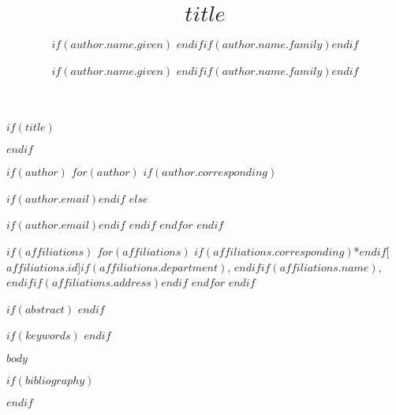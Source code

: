 \documentclass[$for(classoption)$$classoption$$sep$,$endfor$]{$documentclass$}
\theoremstyle{thmstyleone}%
\theoremstyle{thmstyletwo}%
\theoremstyle{thmstylethree}%
\begin{document}
$if(title)$
\title{$title$}
$endif$


$if(author)$
$for(author)$
$if(author.corresponding)$
\author*[$if(author.affiliations)$$for(author.affiliations)$$author.affiliations$$sep$,$endfor$$endif$]{$if(author.name.given)$ $endif$$if(author.name.family)$$endif$}$if(author.email)$$endif$
$else$
\author[$if(author.affiliations)$$for(author.affiliations)$$author.affiliations$$sep$,$endfor$$endif$]{$if(author.name.given)$ $endif$$if(author.name.family)$$endif$}$if(author.email)$$endif$
$endif$
$endfor$
$endif$

$if(affiliations)$
$for(affiliations)$
\affil$if(affiliations.corresponding)$*$endif$[$affiliations.id$]{$if(affiliations.department)$, $endif$$if(affiliations.name)$, $endif$$if(affiliations.address)$$endif$}
$endfor$
$endif$

$if(abstract)$
$endif$

$if(keywords)$
$endif$

\maketitle

$body$

$if(bibliography)$

$endif$
\end{document}
